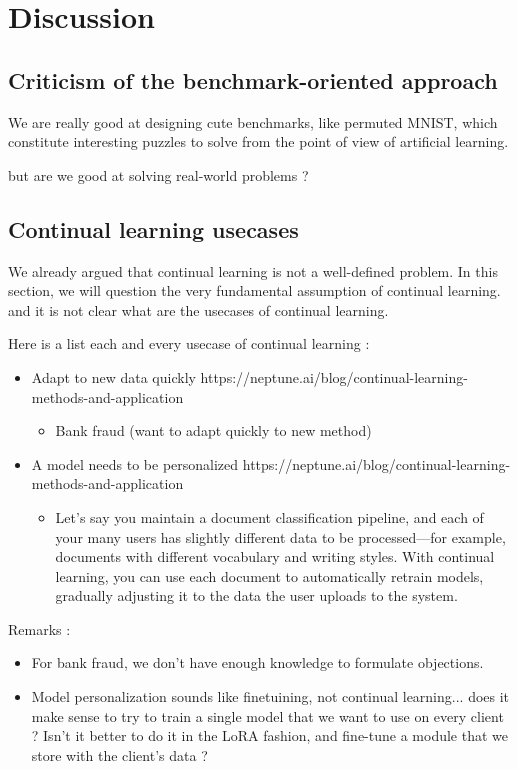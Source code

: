 \documentclass[11pt]{article}
\begin{document}
\section{Discussion}

\subsection{Criticism of the benchmark-oriented approach}

We are really good at designing cute benchmarks, like permuted MNIST, which constitute interesting puzzles to solve from the point of view of artificial learning.

but are we good at solving real-world problems ?

\subsection{Continual learning usecases}

We already argued that continual learning is not a well-defined problem. In this section, we will question the very fundamental assumption of continual learning. and it is not clear what are the usecases of continual learning.

Here is a list each and every usecase of continual learning :
\begin{itemize}
    \item Adapt to new data quickly https://neptune.ai/blog/continual-learning-methods-and-application
        \begin{itemize}
            \item Bank fraud (want to adapt quickly to new method)
        \end{itemize}
    \item A model needs to be personalized https://neptune.ai/blog/continual-learning-methods-and-application
        \begin{itemize}
            \item Let’s say you maintain a document classification pipeline, and each of your many users has slightly different data to be processed—for example, documents with different vocabulary and writing styles. With continual learning, you can use each document to automatically retrain models, gradually adjusting it to the data the user uploads to the system.
        \end{itemize}
\end{itemize}

Remarks :
\begin{itemize}
    \item For bank fraud, we don't have enough knowledge to formulate objections.
    \item Model personalization sounds like finetuining, not continual learning... does it make sense to try to train a single model that we want to use on every client ? Isn't it better to do it in the LoRA fashion, and fine-tune a module that we store with the  client's data ?
\end{itemize}
\end{document}
